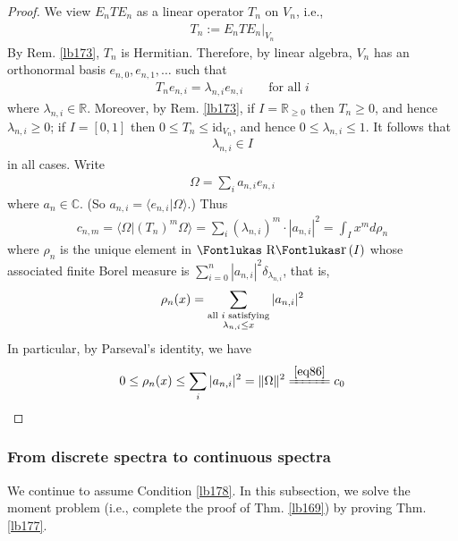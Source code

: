 \documentclass[12pt,b5paper,notitlepage]{article}
\theoremstyle{definition}
\theoremstyle{plain}
\DeclareMathOperator{\Rr}{\text{\Fontlukas R}\text{\kern -0pt {\Fontlukas\large r}}\,}
\newcommand{\id}{\mathrm{id}}
\newcommand{\bk}[1]{\langle {#1}\rangle}
\newcommand{\Cbb}{\mathbb C}
\newcommand{\Rbb}{\mathbb R}
\numberwithin{equation}{section}
\begin{document}
\begin{proof}
We view $E_nTE_n$ as a linear operator $T_n$ on $V_n$, i.e.,
\begin{align}\label{eq120}
T_n:=E_nTE_n\big|_{V_n}
\end{align}
By Rem. \ref{lb173}, $T_n$ is Hermitian. Therefore, by linear algebra, $V_n$ has an orthonormal basis $e_{n,0},e_{n,1},\dots$ such that
\begin{align}
T_ne_{n,i}=\lambda_{n,i}e_{n,i}\qquad\text{for all }i
\end{align}
where $\lambda_{n,i}\in\Rbb$. Moreover, by Rem. \ref{lb173}, if $I=\Rbb_{\geq0}$ then $T_n\geq0$, and hence $\lambda_{n,i}\geq0$; if $I=[0,1]$ then $0\leq T_n\leq\id_{V_n}$, and hence $0\leq\lambda_{n,i}\leq 1$. It follows that
\begin{align*}
\lambda_{n,i}\in I
\end{align*}
in all cases. Write
\begin{align}
\Omega=\sum_i a_{n,i}e_{n,i}
\end{align}
where $a_n\in\Cbb$. (So $a_{n,i}=\bk{e_{n,i}|\Omega}$.) Thus
\begin{align*}
c_{n,m}=\bk{\Omega|(T_n)^m\Omega}=\sum_i (\lambda_{n,i})^m\cdot |a_{n,i}|^2=\int_I x^md\rho_n
\end{align*}
where $\rho_n$ is the unique element in $\Rr(I)$ whose associated finite Borel measure is $\sum_{i=0}^n|a_{n,i}|^2\delta_{\lambda_{n,i}}$, that is,
\begin{align}\label{eq119}
\rho_n(x)=\sum_{
\begin{subarray}{c}
\text{all $i$ satisfying}\\
\lambda_{n,i}\leq x
\end{subarray}
}|a_{n,i}|^2
\end{align}
In particular, by Parseval's identity, we have
\begin{align*}
0\leq \rho_n(x)\leq\sum_i |a_{n,i}|^2=\Vert\Omega\Vert^2\xlongequal{\eqref{eq86}}c_0
\end{align*}
\end{proof}


\subsubsection{From discrete spectra to continuous spectra}\label{lb205}


We continue to assume Condition \ref{lb178}. In this subsection, we solve the moment problem (i.e., complete the proof of Thm. \ref{lb169}) by proving Thm. \ref{lb177}.
\end{document}
